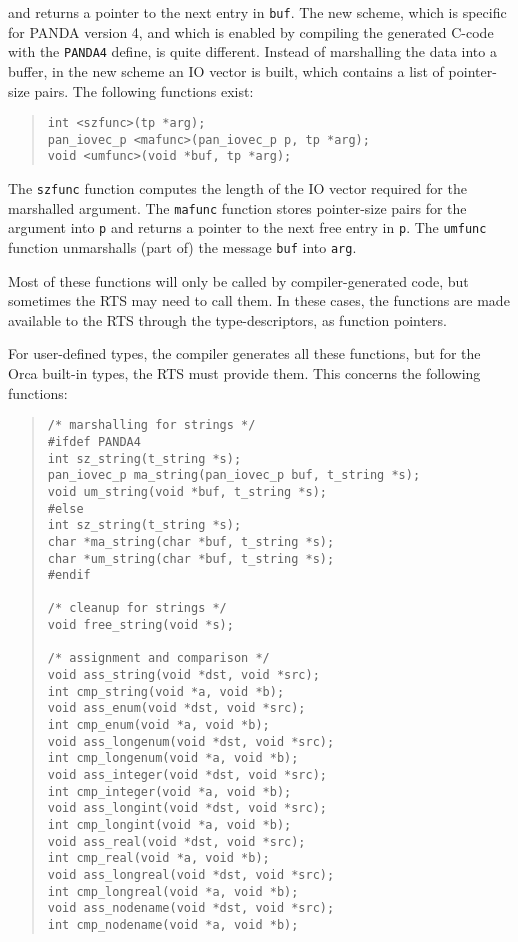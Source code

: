 \documentclass[10pt]{article}
\begin{document}
\begin{description}
and
returns a pointer to the next entry in \verb+buf+.
The new scheme, which is specific for PANDA version 4, and which is
enabled by compiling the generated C-code with the \verb+PANDA4+ define,
is quite different.
Instead of marshalling the data into a buffer, in the new scheme an IO
vector is built, which contains a list of pointer-size pairs.
The following functions exist:
\begin{quote}
\begin{verbatim}
int <szfunc>(tp *arg);
pan_iovec_p <mafunc>(pan_iovec_p p, tp *arg);
void <umfunc>(void *buf, tp *arg);
\end{verbatim}
\end{quote}
The \verb+szfunc+
function computes the length of the IO vector required for
the marshalled argument.
The \verb+mafunc+
function stores pointer-size pairs for the argument into
\verb+p+
and returns a pointer to the next free entry in \verb+p+.
The \verb+umfunc+
function unmarshalls (part of) the message \verb+buf+
into \verb+arg+.
\end{description}

Most of these functions will only be called by compiler-generated code,
but sometimes the RTS may need to call them.
In these cases, the functions are made available to the RTS through
the type-descriptors, as function pointers.

For user-defined types, the compiler generates all these functions, but
for the Orca built-in types, the RTS must provide them. This concerns the
following functions:
\begin{quote}
\begin{verbatim}
/* marshalling for strings */
#ifdef PANDA4
int sz_string(t_string *s);
pan_iovec_p ma_string(pan_iovec_p buf, t_string *s);
void um_string(void *buf, t_string *s);
#else
int sz_string(t_string *s);
char *ma_string(char *buf, t_string *s);
char *um_string(char *buf, t_string *s);
#endif

/* cleanup for strings */
void free_string(void *s);

/* assignment and comparison */
void ass_string(void *dst, void *src);
int cmp_string(void *a, void *b);
void ass_enum(void *dst, void *src);
int cmp_enum(void *a, void *b);
void ass_longenum(void *dst, void *src);
int cmp_longenum(void *a, void *b);
void ass_integer(void *dst, void *src);
int cmp_integer(void *a, void *b);
void ass_longint(void *dst, void *src);
int cmp_longint(void *a, void *b);
void ass_real(void *dst, void *src);
int cmp_real(void *a, void *b);
void ass_longreal(void *dst, void *src);
int cmp_longreal(void *a, void *b);
void ass_nodename(void *dst, void *src);
int cmp_nodename(void *a, void *b);
\end{verbatim}
\end{quote}
\end{document}
